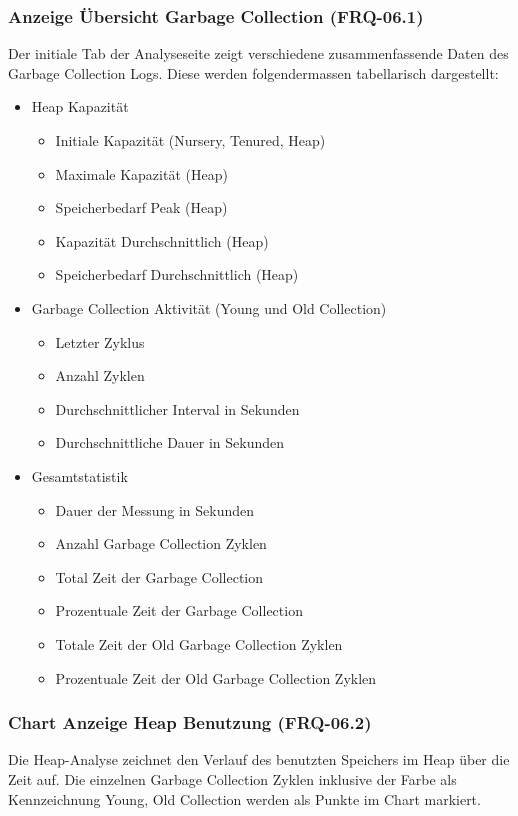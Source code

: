 \subsubsection{Anzeige Übersicht Garbage Collection (FRQ-06.1)}
Der initiale Tab der Analyseseite zeigt verschiedene zusammenfassende Daten des Garbage Collection Logs. Diese werden folgendermassen tabellarisch dargestellt:
\begin{itemize}
	\item Heap Kapazität
	\begin{itemize}
		\item Initiale Kapazität (Nursery, Tenured, Heap)
		\item Maximale Kapazität (Heap)
		\item Speicherbedarf Peak (Heap)
		\item Kapazität Durchschnittlich (Heap)
		\item Speicherbedarf Durchschnittlich (Heap)
	\end{itemize}
	\item Garbage Collection Aktivität (Young und Old Collection)
	\begin{itemize}
		\item Letzter Zyklus
		\item Anzahl Zyklen
		\item Durchschnittlicher Interval in Sekunden
		\item Durchschnittliche Dauer in Sekunden		
	\end{itemize}	
	\item Gesamtstatistik
	\begin{itemize}
		\item Dauer der Messung in Sekunden
		\item Anzahl Garbage Collection Zyklen
		\item Total Zeit der Garbage Collection
		\item Prozentuale Zeit der Garbage Collection
		\item Totale Zeit der Old Garbage Collection Zyklen
		\item Prozentuale Zeit der Old Garbage Collection Zyklen
	\end{itemize}
\end{itemize}

\subsubsection{Chart Anzeige Heap Benutzung (FRQ-06.2)}
Die Heap-Analyse zeichnet den Verlauf des benutzten Speichers im Heap über die Zeit auf. Die einzelnen Garbage Collection Zyklen inklusive der Farbe als Kennzeichnung Young, Old Collection werden als Punkte im Chart markiert.

